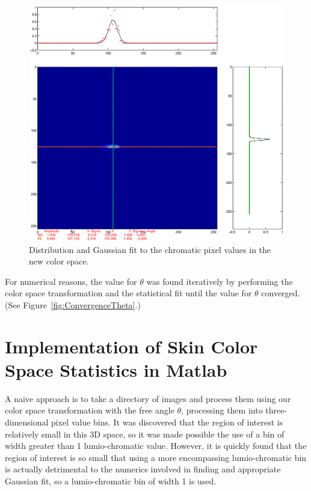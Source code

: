 \begin{figure}[h!]
  \caption{Distribution and Gaussian fit to the chromatic pixel values in the new color space.}
  \label{fig:DistributionAndGaussianFit}
  \centering
    \includegraphics[width=\textwidth]{Chapter2/Figs/crosshairFigureFinal.eps}
\end{figure}


For numerical reasons, the value for $\theta$ was found iteratively by performing the color space transformation and the statistical fit until the value for $\theta$ converged. (See Figure~\ref{fig:ConvergenceTheta}.)


\section{Implementation of Skin Color Space Statistics in Matlab}\label{sec:SkinColorSpaceStatsMatlab}

A naive approach is to take a directory of images and process them using our color space transformation with the free angle $\theta$, processing them into three-dimensional pixel value bins. It was discovered that the region of interest is relatively small in this 3D space, so it was made possible the use of a bin of width greater than 1 lumio-chromatic value. However, it is quickly found that the region of interest is so small that using a more encompassing lumio-chromatic bin is actually detrimental to the numerics involved in finding and appropriate Gaussian fit, so a lumio-chromatic bin of width 1 is used.

